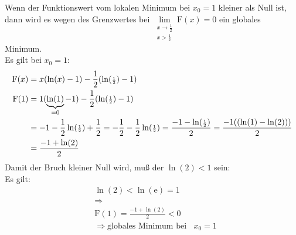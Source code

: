 Wenn der Funktionswert vom lokalen Minimum bei $ x_0=1 $  kleiner als Null ist, dann wird es wegen des  Grenzwertes bei $\lim\limits_ {\substack{x\to \frac{1}{2}\\x>\frac{1}{2}}}\mathrm{F}(x)= 0  $ ein globales Minimum.\\
Es gilt bei $ x_0=1 $:\\
\begin{align*}
\mathrm{F}(x)&=x(\ln(x)-1)-\frac{1}{2}(\ln(\genfrac{}{}{}{2}{1}{2})-1)\\
\mathrm{F}(1)&=1(\underbrace {\ln(1)}_{=0}-1)-\frac{1}{2}(\ln(\genfrac{}{}{}{2}{1}{2})-1)\\
&=-1-\frac{1}{2}\ln(\genfrac{}{}{}{2}{1 }{2 })+\frac{1}{2}=-\frac{1}{2}-\frac{1}{2}\ln(\genfrac{}{}{}{2}{1}{2 })=\frac{-1-\ln(\genfrac{}{}{}{2}{1 }{2 })}{2}=\frac{-1((\ln(1)-\ln(2)))}{2}\\
&=\frac{-1+\ln(2)}{2}
\end{align*}
Damit der Bruch kleiner Null wird, muß der $ \ln(2) <1$ sein:\\
Es gilt:\\
\begin{align*}
&\ln(2)<\ln(\mathrm{e})=1\\
&\Rightarrow\\
&\mathrm{F}(1)=\frac{-1+\ln(2)}{2}<0\\
&\Rightarrow\text{globales Minimum bei }\;\;x_0=1
\end{align*}
